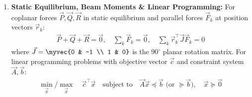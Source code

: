\begin{enumerate}[label=\thesubsection.\arabic*, ref=\thesubsection.\theenumi]
	\item \textbf{Static Equilibrium, Beam Moments \& Linear Programming:}
	For coplanar forces $\vec{P}, \vec{Q}, \vec{R}$ in static equilibrium and parallel forces $\vec{F}_k$ at position vectors $\vec{r}_k$:
	\begin{align}
		\vec{P} + \vec{Q} + \vec{R} = \vec{0}, \quad \sum_{k} \vec{F}_k = \vec{0}, \quad \sum_{k} \vec{r}_k^{\top}\vec{J}\vec{F}_k = 0 \label{eq:static_equilibrium_forces}
	\end{align}
	where $\vec{J} = \myvec{0 & -1 \\ 1 & 0}$ is the $90^\circ$ planar rotation matrix. For linear programming problems with objective vector $\vec{c}$ and constraint system $\vec{A}, \vec{b}$:
	\begin{align}
		\min_{\vec{x}} / \max_{\vec{x}} \quad \vec{c}^{\top}\vec{x} \quad \text{subject to} \quad \vec{A}\vec{x} \preceq \vec{b} \text{ (or } \succeq \vec{b}\text{)}, \quad \vec{x} \succeq \vec{0} \label{eq:lpp_cvxpy_form}
	\end{align}
	
\end{enumerate}